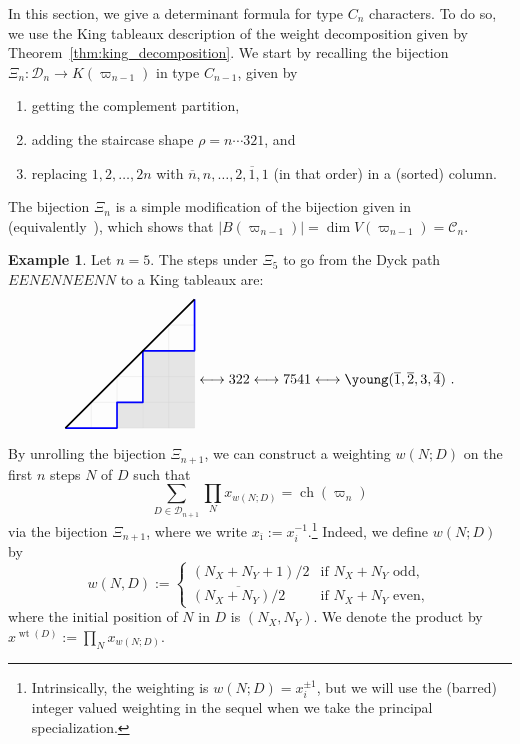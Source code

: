 \documentclass[11pt, leqno]{amsart}
\theoremstyle{plain}
\theoremstyle{definition}
\newtheorem{example}[theorem]{Example}
\numberwithin{equation}{section}
\newcommand{\fw}{\varpi} %
\newcommand{\seteq}{\mathbin{:=}}
\newcommand{\Cat}{\mathcal{C}} %
\newcommand{\Dyck}{\mathcal{D}} %
\newcommand{\wt}{\operatorname{wt}} %
\newcommand{\ch}{\operatorname{ch}} %
\newcommand{\ofour}{\overline{4}}
\newcommand{\otwo}{\overline{2}}
\newcommand{\one}{\overline{1}}
\newcommand{\on}{\overline{n}}
\newcommand{\dyckgrid}[1]{
\foreach \i in {0, ..., #1} {\draw[gray!40, very thin] (\i,\i) -- (#1, \i); \draw[gray!40, very thin] (\i,\i) -- (\i, 0);}
}
\newcommand{\defn}[1]{{\color{darkred}\emph{#1}}} %
\begin{document}
In this section, we give a determinant formula for type $C_n$ characters. To do so, we use the King tableaux description of the weight decomposition given by Theorem~\ref{thm:king_decomposition}. We start by recalling the bijection $\Xi_n \colon \Dyck_n \to K(\fw_{n-1})$ in type $C_{n-1}$, given by
\begin{enumerate}
\item\label{bij_step1} getting the complement partition,
\item\label{bij_step2} adding the staircase shape $\rho = n \dotsm 321$, and
\item\label{bij_step3} replacing $1, 2, \dotsc, 2n$ with $\on, n, \dotsc, 2, \one, 1$ (in that order) in a (sorted) column.
\end{enumerate}
The bijection $\Xi_n$ is a simple modification of the bijection given in~\cite[Exercise~6.19(t)]{ECII} (equivalently~\cite[Item~79]{Stanley15}), which shows that $\lvert B(\fw_{n-1}) \rvert = \dim V(\fw_{n-1}) = \Cat_n$.

\begin{example}
\label{ex:dyck_tableau_bij}
Let $n = 5$. The steps under $\Xi_5$ to go from the Dyck path $EENENNEENN$ to a King tableaux are:
\[
\begin{tikzpicture}[scale=0.65, baseline=32]
\fill[gray!20] (3,3) rectangle (5,0);
\fill[gray!20] (2,0) rectangle (3,1);
\dyckgrid{5}
\draw[-, blue, very thick, line join=round] (0,0) -- (2,0) -- (2,1) -- (3,1) -- (3,3) -- (5,3) -- (5,5);
\draw[-,very thick] (0,0) -- (5,5);
\end{tikzpicture}
\longleftrightarrow
322
\longleftrightarrow
7541
\longleftrightarrow
\young(\one,\otwo,3,\ofour)\ .
\]
\end{example}

By unrolling the bijection $\Xi_{n+1}$, we can construct a weighting $w(N;D)$ on the first $n$ steps $N$ of $D$ such that
\[
\sum_{D \in \Dyck_{n+1}} \prod_N x_{w(N;D)} = \ch(\fw_n)
\]
via the bijection $\Xi_{n+1}$, where we write $x_{\overline{\imath}} \seteq x_i^{-1}$.\footnote{Intrinsically, the weighting is $w(N;D) = x_i^{\pm 1}$, but we will use the (barred) integer valued weighting in the sequel when we take the principal specialization.} Indeed, we define $w(N;D)$ by
\[
w(N, D) \seteq \begin{cases}
(N_X + N_Y + 1) / 2 & \text{if $N_X + N_Y$ odd}, \\
\overline{(N_X + N_Y) / 2} & \text{if $N_X + N_Y$ even},
\end{cases}
\]
where the initial position of $N$ in $D$ is $(N_X, N_Y)$. We denote the product by $x^{\wt(D)} \seteq \prod_N x_{w(N;D)}$.
\end{document}
